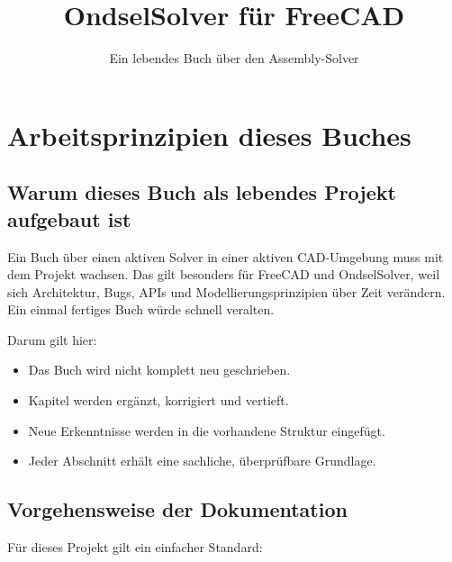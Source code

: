 \documentclass[
  12pt
]{book}
\title{OndselSolver für FreeCAD}
\subtitle{Ein lebendes Buch über den Assembly-Solver}
\author{}
\date{}
\providecommand{\tightlist}{%
  \setlength{\itemsep}{0pt}\setlength{\parskip}{0pt}}
\begin{document}
\frontmatter
\maketitle

\renewcommand*\contentsname{Inhaltsverzeichnis}
{
\setcounter{tocdepth}{1}
\tableofcontents
}
\mainmatter
\hypertarget{kap-arbeitsprinzipien}{%
\chapter*{Arbeitsprinzipien dieses Buches}\label{kap-arbeitsprinzipien}}

\hypertarget{warum-dieses-buch-als-lebendes-projekt-aufgebaut-ist}{%
\section*{Warum dieses Buch als lebendes Projekt aufgebaut
ist}\label{warum-dieses-buch-als-lebendes-projekt-aufgebaut-ist}}

Ein Buch über einen aktiven Solver in einer aktiven CAD-Umgebung muss
mit dem Projekt wachsen. Das gilt besonders für FreeCAD und
OndselSolver, weil sich Architektur, Bugs, APIs und
Modellierungsprinzipien über Zeit verändern. Ein einmal fertiges Buch
würde schnell veralten.

Darum gilt hier:

\begin{itemize}
\tightlist
\item
  Das Buch wird nicht komplett neu geschrieben.
\item
  Kapitel werden ergänzt, korrigiert und vertieft.
\item
  Neue Erkenntnisse werden in die vorhandene Struktur eingefügt.
\item
  Jeder Abschnitt erhält eine sachliche, überprüfbare Grundlage.
\end{itemize}

\hypertarget{vorgehensweise-der-dokumentation}{%
\section*{Vorgehensweise der
Dokumentation}\label{vorgehensweise-der-dokumentation}}

Für dieses Projekt gilt ein einfacher Standard:
\end{document}
